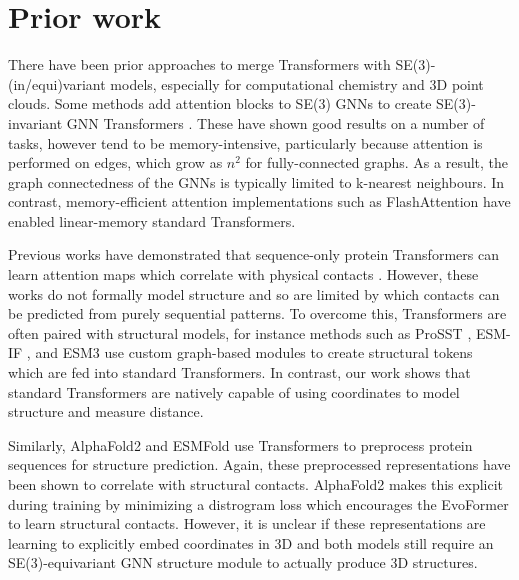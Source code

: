 \section{Prior work}
There have been prior approaches to merge Transformers with SE(3)-(in/equi)variant models, especially for computational chemistry and 3D point clouds.
Some methods add attention blocks to SE(3) GNNs to create SE(3)-invariant GNN Transformers \citep{fuchs_se3-transformers_2020, liao_equiformer_2023}.
These have shown good results on a number of tasks, however tend to be memory-intensive, particularly because attention is performed on edges, which grow as $n^2$ for fully-connected graphs.
As a result, the graph connectedness of the GNNs is typically limited to k-nearest neighbours.
In contrast, memory-efficient attention implementations such as FlashAttention \citep{dao_flashattention_2022, dao_flashattention-2_2023} have enabled linear-memory standard Transformers.

Previous works have demonstrated that sequence-only protein Transformers can learn attention maps which correlate with physical contacts \citep{lin_evolutionary-scale_2023, vig_bertology_2020}.
However, these works do not formally model structure and so are limited by which contacts can be predicted from purely sequential patterns.
To overcome this, Transformers are often paired with structural models, for instance methods such as ProSST \citep{li_prosst_2024}, ESM-IF \citep{hsu_learning_2022}, and ESM3 \citep{hayes_simulating_2024} use custom graph-based modules to create structural tokens which are fed into standard Transformers.
In contrast, our work shows that standard Transformers are natively capable of using coordinates to model structure and measure distance.

Similarly, AlphaFold2 \citep{jumper_highly_2021} and ESMFold \citep{lin_evolutionary-scale_2023} use Transformers to preprocess protein sequences for structure prediction.
Again, these preprocessed representations have been shown to correlate with structural contacts.
AlphaFold2 makes this explicit during training by minimizing a distrogram loss which encourages the EvoFormer to learn structural contacts.
However, it is unclear if these representations are learning to explicitly embed coordinates in 3D and both models still require an SE(3)-equivariant GNN structure module to actually produce 3D structures.

